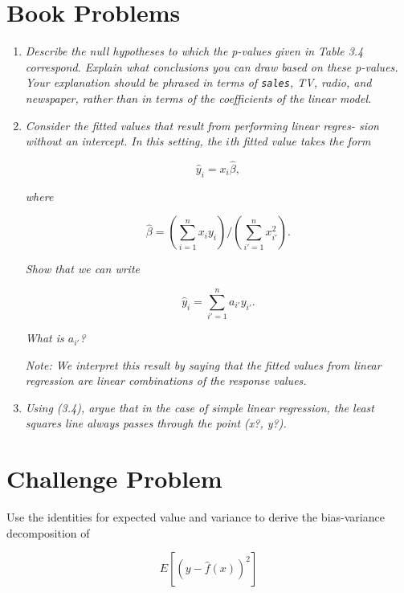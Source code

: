 \documentclass[11pt]{article}
\begin{document}
    
    
\bigskip

\section*{Book Problems}


\begin{enumerate}
	\item \textit{Describe the null hypotheses to which the p-values given in Table 3.4 correspond. Explain what conclusions you can draw based on these p-values. Your explanation should be phrased in terms of \texttt{sales}, TV, radio, and newspaper, rather than in terms of the coefficients of the linear model.}
	
  	\setcounter{enumi}{4}

	\item \textit{Consider the fitted values that result from performing linear regres- sion without an intercept. In this setting, the $i$th fitted value takes the form}
	
	$$ \hat{y}_i = x_i\hat{\beta},$$
	
	\textit{where}
	
	$$ \hat{\beta} = \left(\sum_{i=1}^nx_iy_i\right) / \left(\sum_{i'=1}^nx_{i'}^2\right).$$
	
	
	\textit{Show that we can write}
	
	$$ \hat{y}_i = \sum_{i'=1}^na_{i'}y_{i'}.$$
	
	\textit{What is $a_{i'}$?}
	
	\textit{Note: We interpret this result by saying that the fitted values from linear regression are linear combinations of the response values.}
	
	\item \textit{Using (3.4), argue that in the case of simple linear regression, the
least squares line always passes through the point (x?, y?).
}
	
\end{enumerate}


\section*{Challenge Problem}
Use the identities for expected value and variance to derive the bias-variance decomposition of 

$$ E\left[ \left(y - \hat{f}(x) \right)^2 \right]$$
\end{document}
